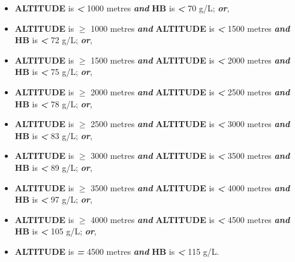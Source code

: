 \documentclass[12pt,a4paper]{article}
\begin{document}
\begin{itemize}
  \begin{itemize}
  \item
    \textbf{ALTITUDE} is \textbf{\emph{\textless{}}} 1000 metres \textbf{\emph{and}} \textbf{HB} is \textbf{\emph{\textless{}}} 70 g/L; \textbf{\emph{or}},
  \item
    \textbf{ALTITUDE} is \textbf{\emph{\(\geq\)}} 1000 metres \textbf{\emph{and}} \textbf{ALTITUDE} is \textbf{\emph{\textless{}}} 1500 metres \textbf{\emph{and}} \textbf{HB} is \textbf{\emph{\textless{}}} 72 g/L; \textbf{\emph{or}},
  \item
    \textbf{ALTITUDE} is \textbf{\emph{\(\geq\)}} 1500 metres \textbf{\emph{and}} \textbf{ALTITUDE} is \textbf{\emph{\textless{}}} 2000 metres \textbf{\emph{and}} \textbf{HB} is \textbf{\emph{\textless{}}} 75 g/L; \textbf{\emph{or}},
  \item
    \textbf{ALTITUDE} is \textbf{\emph{\(\geq\)}} 2000 metres \textbf{\emph{and}} \textbf{ALTITUDE} is \textbf{\emph{\textless{}}} 2500 metres \textbf{\emph{and}} \textbf{HB} is \textbf{\emph{\textless{}}} 78 g/L; \textbf{\emph{or}},
  \item
    \textbf{ALTITUDE} is \textbf{\emph{\(\geq\)}} 2500 metres \textbf{\emph{and}} \textbf{ALTITUDE} is \textbf{\emph{\textless{}}} 3000 metres \textbf{\emph{and}} \textbf{HB} is \textbf{\emph{\textless{}}} 83 g/L; \textbf{\emph{or}},
  \item
    \textbf{ALTITUDE} is \textbf{\emph{\(\geq\)}} 3000 metres \textbf{\emph{and}} \textbf{ALTITUDE} is \textbf{\emph{\textless{}}} 3500 metres \textbf{\emph{and}} \textbf{HB} is \textbf{\emph{\textless{}}} 89 g/L; \textbf{\emph{or}},
  \item
    \textbf{ALTITUDE} is \textbf{\emph{\(\geq\)}} 3500 metres \textbf{\emph{and}} \textbf{ALTITUDE} is \textbf{\emph{\textless{}}} 4000 metres \textbf{\emph{and}} \textbf{HB} is \textbf{\emph{\textless{}}} 97 g/L; \textbf{\emph{or}},
  \item
    \textbf{ALTITUDE} is \textbf{\emph{\(\geq\)}} 4000 metres \textbf{\emph{and}} \textbf{ALTITUDE} is \textbf{\emph{\textless{}}} 4500 metres \textbf{\emph{and}} \textbf{HB} is \textbf{\emph{\textless{}}} 105 g/L; \textbf{\emph{or}},
  \item
    \textbf{ALTITUDE} is \textbf{\emph{=}} 4500 metres \textbf{\emph{and}} \textbf{HB} is \textbf{\emph{\textless{}}} 115 g/L.
  \end{itemize}
\end{itemize}

\newpage
\end{document}
